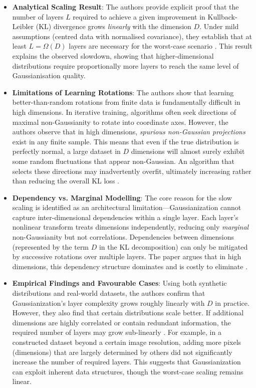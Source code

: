 \begin{itemize}
    \item \textbf{Analytical Scaling Result}: The authors provide explicit proof that the number of layers $L$ required to achieve a given improvement in Kullback-Leibler (KL) divergence grows \textit{linearly} with the dimension $D$. Under mild assumptions (centred data with normalised covariance), they establish that at least $L = \Omega(D)$ layers are necessary for the worst-case scenario \cite{draxler2023convergence}. This result explains the observed slowdown, showing that higher-dimensional distributions require proportionally more layers to reach the same level of Gaussianisation quality.
    
    \item \textbf{Limitations of Learning Rotations}: The authors show that learning better-than-random rotations from finite data is fundamentally difficult in high dimensions. In iterative training, algorithms often seek directions of maximal non-Gaussianity to rotate into coordinate axes. However, the authors observe that in high dimensions, \textit{spurious non-Gaussian projections} exist in any finite sample. This means that even if the true distribution is perfectly normal, a large dataset in $D$ dimensions will almost surely exhibit some random fluctuations that appear non-Gaussian. An algorithm that selects these directions may inadvertently overfit, ultimately increasing rather than reducing the overall KL loss \cite{draxler2023convergence}.
    
    \item \textbf{Dependency vs. Marginal Modelling}: The core reason for the slow scaling is identified as an architectural limitation—Gaussianization cannot capture inter-dimensional dependencies within a single layer. Each layer's nonlinear transform treats dimensions independently, reducing only \textit{marginal} non-Gaussianity but not correlations. Dependencies between dimensions (represented by the term $D$ in the KL decomposition) can only be mitigated by successive rotations over multiple layers. The paper argues that in high dimensions, this dependency structure dominates and is costly to eliminate \cite{draxler2023convergence}.

    \item \textbf{Empirical Findings and Favourable Cases}: Using both synthetic distributions and real-world datasets, the authors confirm that Gaussianization's layer complexity grows roughly linearly with $D$ in practice. However, they also find that certain distributions scale better. If additional dimensions are highly correlated or contain redundant information, the required number of layers may grow sub-linearly \cite{draxler2023convergence}. For example, in a constructed dataset beyond a certain image resolution, adding more pixels (dimensions) that are largely determined by others did not significantly increase the number of required layers. This suggests that Gaussianization can exploit inherent data structures, though the worst-case scaling remains linear.
\end{itemize}


